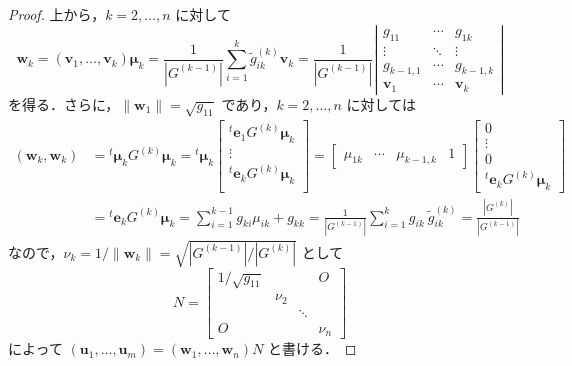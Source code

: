 \documentclass[11pt, uplatex, dvipdfmx]{jsarticle}
\theoremstyle{definition}
\begin{document}
\begin{proof}
  上から，$k=2, \ldots, n$ に対して
  \[
    \bm{w}_k = (\bm{v}_1, \ldots, \bm{v}_k) \bm{\mu}_k
    = \frac{1}{\left| G^{(k-1)} \right|} \sum_{i=1}^{k} \tilde{g}^{(k)}_{ik} \bm{v}_k
    = \frac{1}{\left|G^{(k-1)} \right|}\left|
      \begin{array}{ccc}
        g_{11} & \cdots & g_{1k}\\
        \vdots & \ddots & \vdots\\
        g_{k-1,1} & \cdots & g_{k-1,k}\\
        \bm{v}_1 & \cdots & \bm{v}_k
      \end{array}
    \right|
  \]
  を得る．さらに，$\|\bm{w}_1\| = \sqrt{g_{11}}$ であり，$k=2, \ldots, n$ に対しては
  \[
    \begin{aligned}
      (\bm{w}_k, \bm{w}_k) &= {}^{t}\bm{\mu}_k G^{(k)} \bm{\mu}_k = {}^{t} \bm{\mu}_k \left[
        \begin{array}{c}
          {}^{t}\bm{e}_1 G^{(k)}\bm{\mu}_k\\
          \vdots \\
          {}^{t} \bm{e}_{k} G^{(k)}\bm{\mu}_k\\
        \end{array}
      \right] = \left[
        \begin{array}{cccc}
          \mu_{1k} & \cdots & \mu_{k-1,k} & 1
        \end{array}
      \right] \left[
        \begin{array}{c}
          0\\
          \vdots\\
          0\\
          {}^{t}\bm{e}_k G^{(k)}\bm{\mu}_k
        \end{array}
      \right]\\
      &= {}^{t} \bm{e}_k G^{(k)}\bm{\mu}_k = \sum_{i=1}^{k-1} g_{ki} \mu_{ik} + g_{kk}
      = \frac{1}{\left| G^{(k-1)}\right|}\sum_{i=1}^{k}g_{ik} ~ \tilde{g}^{(k)}_{ik}
      = \frac{\left| G^{(k)}\right|}{\left|G^{(k-1)}\right|}
    \end{aligned}
  \]
  なので，$\nu_k = 1/\|\bm{w}_k\| = \sqrt{\left|G^{(k-1)}\right|/\left|G^{(k)}\right|}$ として
  \[
    N = \left[
      \begin{array}{cccc}
        1/\sqrt{g_{11}} & & & O\\
                       & \nu_2 & & \\
                       & & \ddots & \\
        O & & & \nu_n
      \end{array}
    \right]
  \]
  によって $(\bm{u}_1, \ldots, \bm{u}_m) = (\bm{w}_1, \ldots, \bm{w}_n) N$ と書ける．
\end{proof}
\end{document}

